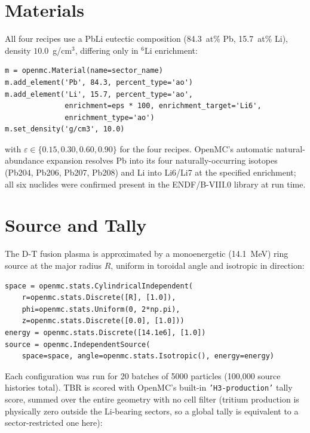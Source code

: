 \documentclass[11pt]{article}
\begin{document}
\section{Materials}

All four recipes use a PbLi eutectic composition (84.3~at\% Pb, 15.7~at\%
Li), density $10.0$~g/cm$^3$, differing only in $^6$Li enrichment:

\begin{lstlisting}[style=pystyle]
m = openmc.Material(name=sector_name)
m.add_element('Pb', 84.3, percent_type='ao')
m.add_element('Li', 15.7, percent_type='ao',
              enrichment=eps * 100, enrichment_target='Li6',
              enrichment_type='ao')
m.set_density('g/cm3', 10.0)
\end{lstlisting}

with $\varepsilon\in\{0.15,0.30,0.60,0.90\}$ for the four recipes.
OpenMC's automatic natural-abundance expansion resolves Pb into its four
naturally-occurring isotopes (Pb204, Pb206, Pb207, Pb208) and Li into
Li6/Li7 at the specified enrichment; all six nuclides were confirmed
present in the ENDF/B-VIII.0 library at run time.

\section{Source and Tally}

The D-T fusion plasma is approximated by a monoenergetic (14.1~MeV) ring
source at the major radius $R$, uniform in toroidal angle and isotropic in
direction:

\begin{lstlisting}[style=pystyle]
space = openmc.stats.CylindricalIndependent(
    r=openmc.stats.Discrete([R], [1.0]),
    phi=openmc.stats.Uniform(0, 2*np.pi),
    z=openmc.stats.Discrete([0.0], [1.0]))
energy = openmc.stats.Discrete([14.1e6], [1.0])
source = openmc.IndependentSource(
    space=space, angle=openmc.stats.Isotropic(), energy=energy)
\end{lstlisting}

Each configuration was run for 20 batches of 5000 particles (100{,}000
source histories total). TBR is scored with OpenMC's built-in
\texttt{'H3-production'} tally score, summed over the entire geometry with
no cell filter (tritium production is physically zero outside the
Li-bearing sectors, so a global tally is equivalent to a sector-restricted
one here):
\end{document}
